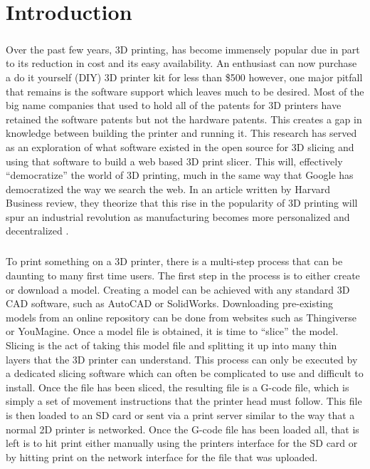 \chapter{Introduction}
\paragraph{}
Over the past few years, 3D printing, has become immensely popular due in part to its reduction in cost and its easy availability.
An enthusiast can now purchase a do it yourself (DIY) 3D printer kit for less than \$500 however, one major pitfall that remains is the software support which leaves much to be desired.
Most of the big name companies that used to hold all of the patents for 3D printers have retained the software patents but not the hardware patents. 
This creates a gap in knowledge between building the printer and running it.
This research has served as an exploration of what software existed in the open source for 3D slicing and using that software to build a web based 3D print slicer.
This will, effectively “democratize” the world of 3D printing, much in the same way that Google has democratized the way we search the web. 
In an article written by Harvard Business review, they theorize that this rise in the popularity of 3D printing will spur an industrial revolution as manufacturing becomes more personalized and decentralized \citep{daveni-2015}.

\paragraph{}
To print something on a 3D printer, there is a multi-step process that can be daunting to many first time users. 
The first step in the process is to either create or download a model.
Creating a model can be achieved with any standard 3D CAD software, such as AutoCAD or SolidWorks.
Downloading pre-existing models from an online repository can be done from websites such as Thingiverse or YouMagine.
Once a model file is obtained, it is time to “slice” the model.
Slicing is the act of taking this model file and splitting it up into many thin layers that the 3D printer can understand.
This process can only be executed by a dedicated slicing software which can often be complicated to use and difficult to install.
Once the file has been sliced, the resulting file is a G-code file, which is simply a set of movement instructions that the printer head must follow.
This file is then loaded to an SD card or sent via a print server similar to the way that a normal 2D printer is networked.
Once the G-code file has been loaded all, that is left is to hit print either manually using the printers interface for the SD card or by hitting print on the network interface for the file that was uploaded.

